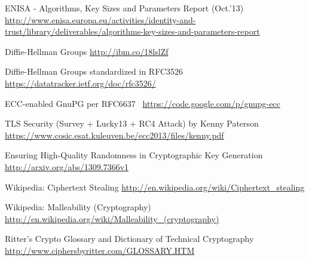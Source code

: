 \begin{itemize*}
  \item ENISA - Algorithms, Key Sizes and Parameters Report (Oct.'13) \url{http://www.enisa.europa.eu/activities/identity-and-trust/library/deliverables/algorithms-key-sizes-and-parameters-report}
  \item Diffie-Hellman Groups \url{http://ibm.co/18lslZf}
  \item Diffie-Hellman Groups standardized in RFC3526~\cite{rfc3526} \url{https://datatracker.ietf.org/doc/rfc3526/}
  \item ECC-enabled GnuPG per RFC6637~\cite{rfc6637} \url{https://code.google.com/p/gnupg-ecc}
  \item TLS Security (Survey + Lucky13 + RC4 Attack) by Kenny Paterson \url{https://www.cosic.esat.kuleuven.be/ecc2013/files/kenny.pdf}
  \item Ensuring High-Quality Randomness in Cryptographic Key Generation \url{http://arxiv.org/abs/1309.7366v1}
  \item Wikipedia: Ciphertext Stealing \url{http://en.wikipedia.org/wiki/Ciphertext_stealing}
  \item Wikipedia: Malleability (Cryptography) \url{http://en.wikipedia.org/wiki/Malleability_(cryptography)}
  \item Ritter's Crypto Glossary and Dictionary of Technical Cryptography \url{http://www.ciphersbyritter.com/GLOSSARY.HTM}
\end{itemize*}
